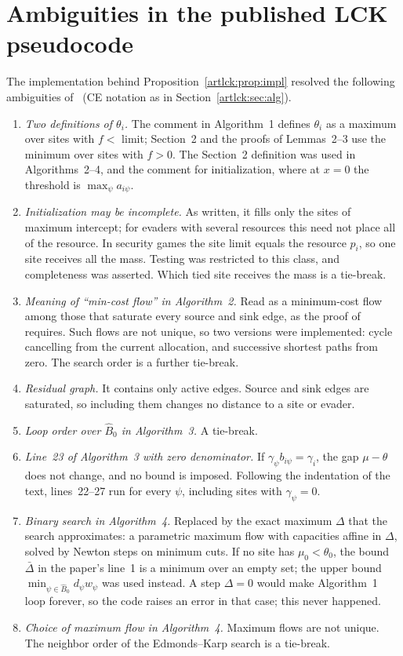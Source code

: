 \section{Ambiguities in the published LCK pseudocode}

The implementation behind Proposition~\ref{artlck:prop:impl} resolved the following ambiguities
of~\cite[Section~6.2]{lck16} (CE notation as in Section~\ref{artlck:sec:alg}).
\begin{enumerate}[nosep]
\item \emph{Two definitions of $\theta_i$.} The comment in Algorithm~1 defines $\theta_i$ as a maximum
over sites with $f<$ limit; Section~2 and the proofs of Lemmas~2--3 use the minimum over sites with
$f>0$. The Section~2 definition was used in Algorithms~2--4, and the comment for initialization, where at
$x=0$ the threshold is $\max_\psi a_{i\psi}$.
\item \emph{Initialization may be incomplete.} As written, it fills only the sites of maximum intercept;
for evaders with several resources this need not place all of the resource. In security games the site
limit equals the resource $p_i$, so one site receives all the mass. Testing was restricted to this class,
and completeness was asserted. Which tied site receives the mass is a tie-break.
\item \emph{Meaning of ``min-cost flow'' in Algorithm~2.} Read as a minimum-cost flow among those that
saturate every source and sink edge, as the proof of~\cite[Lemma~2]{lck16} requires. Such flows are not
unique, so two versions were implemented: cycle cancelling from the current allocation, and successive
shortest paths from zero. The search order is a further tie-break.
\item \emph{Residual graph.} It contains only active edges. Source and sink edges are saturated, so
including them changes no distance to a site or evader.
\item \emph{Loop order over $\hat B_0$ in Algorithm~3.} A tie-break.
\item \emph{Line~23 of Algorithm~3 with zero denominator.} If $\gamma_\psi b_{i\psi}=\gamma_i$, the gap
$\mu-\theta$ does not change, and no bound is imposed. Following the indentation of the text,
lines~22--27 run for every $\psi$, including sites with $\gamma_\psi=0$.
\item \emph{Binary search in Algorithm~4.} Replaced by the exact maximum $\Delta$ that the search
approximates: a parametric maximum flow with capacities affine in $\Delta$, solved by Newton steps on
minimum cuts. If no site has $\mu_0<\theta_0$, the bound $\bar\Delta$ in the paper's line~1 is a minimum
over an empty set; the upper bound $\min_{\psi\in\hat B_0}d_\psi w_\psi$ was used instead. A step
$\Delta=0$ would make Algorithm~1 loop forever, so the code raises an error in that case; this never
happened.
\item \emph{Choice of maximum flow in Algorithm~4.} Maximum flows are not unique. The neighbor order of
the Edmonds--Karp search is a tie-break.
\end{enumerate}

